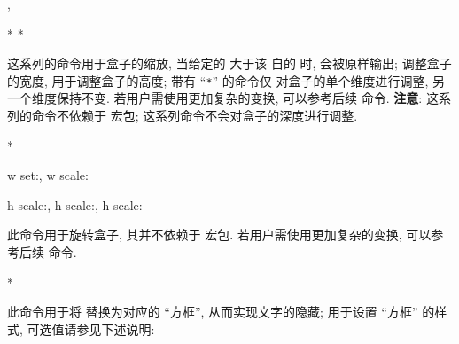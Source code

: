 \begin{function}[added=2025-07-10]{\wscale, \hscale}
  \begin{syntax}
    *
    *
  \end{syntax}
  这系列的命令用于盒子的缩放, 当给定的  大于该  自的  时, 
  会被原样输出;  调整盒子的宽度,  用于调整盒子的高度; 带有 ``\texttt{*}'' 的命令仅
  对盒子的单个维度进行调整, 另一个维度保持不变. 若用户需使用更加复杂的变换, 可以参考后续
   命令.
  \textbf{注意}: 这系列的命令不依赖于  宏包; 这系列命令不会对盒子的深度进行调整.
\end{function}
\begin{DocExample}*
{\setlength{\fboxsep}{0pt}
  w set:,
  w scale:\par
  h scale:,
  h scale:,
  h scale:\par
}
\end{DocExample}


\begin{function}[added=2025-07-11]{\zrotate}
  \begin{syntax}
  \end{syntax}
  此命令用于旋转盒子, 其并不依赖于  宏包. 若用户需使用更加复杂的变换, 可以参考后续
   命令.
\end{function}
\begin{DocExample}*
{\setlength{\fboxsep}{0pt}
}
\end{DocExample}


\begin{function}[added=2025-07-10]{\hidetext}
  \begin{syntax}
  \end{syntax}
  此命令用于将  替换为对应的 ``方框'', 从而实现文字的隐藏;
   用于设置 ``方框'' 的样式, 可选值请参见下述说明:
\end{function}


